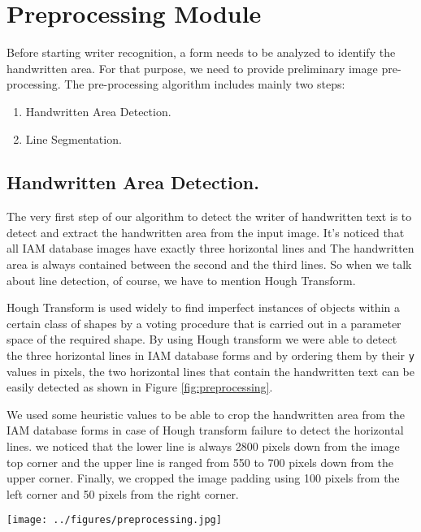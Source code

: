 \section{Preprocessing Module}
Before starting writer recognition, a form needs to be analyzed to identify the handwritten area. For that purpose, we need to provide preliminary image pre-processing. The pre-processing algorithm includes mainly two steps:
\begin{enumerate}
  \item Handwritten Area Detection.
  \item Line Segmentation.
\end{enumerate}

\subsection{Handwritten Area Detection.}
The very first step of our algorithm to detect the writer of handwritten text is to detect and extract the handwritten area from the input image. It's noticed that all IAM database images have exactly three horizontal lines and The handwritten area is always contained between the second and the third lines. So when we talk about line detection, of course, we have to mention Hough Transform. 

Hough Transform is used widely to find imperfect instances of objects within a certain class of shapes by a voting procedure that is carried out in a parameter space of the required shape. By using Hough transform we were able to detect the three horizontal lines in IAM database forms and by ordering them by their \texttt{y} values in pixels, the two horizontal lines that contain the handwritten text can be easily detected as shown in Figure \ref{fig:preprocessing}. 

We used some heuristic values to be able to crop the handwritten area from the IAM database forms in case of Hough transform failure to detect the horizontal lines. we noticed that the lower line is always 2800 pixels down from the image top corner and the upper line is ranged from 550 to 700 pixels down from the upper corner. Finally, we cropped the image padding using 100 pixels from the left corner and 50 pixels from the right corner.

\begin{figure*}[h]
    \centering
    \texttt{[image: ../figures/preprocessing.jpg]}
    \label{fig:preprocessing}
\end{figure*}

